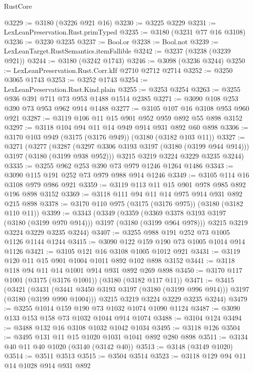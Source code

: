 \begin{lexlean}{RustCore}
\begin{coremodule}
@3229 := @3180 (@3226 @921 @16)
@3230 := @3225 @3229
@3231 := LexLeanPreservation.Rust.primTyped
@3235 := @3180 (@3231 @77 @16 @3108)
@3236 := @3230 @3235
@3237 := Bool.or
@3238 := Bool.not
@3239 := LexLeanTarget.RustSemantics.itemFallible
@3242 := @3237 (@3238 (@3239 @921))
@3244 := @3180 (@3242 @1743)
@3246 := @3098 (@3236 @3244)
@3250 := LexLeanPreservation.Rust.Corr.kIf @2710 @2712 @2714
@3252 := @3250 @3065 @1743
@3253 := @3252 @1743
@3254 := LexLeanPreservation.Rust.Kind.plain
@3255 := @3253 @3254
@3263 := @3255 @936 @391 @711 @73 @953 @1488 @1514 @2385
@3271 := @3090 @108 @253 @390 @73 @953 @962 @914 @1488
@3277 := @3105 @107 @16 @3108 @953 @960 @921
@3287 := @3119 @106 @11 @15 @901 @952 @959 @892 @55 @898 @3152
@3297 := @3118 @104 @94 @11 @14 @949 @914 @931 @892 @60 @898
@3306 := @3170 @103 @949 (@3175 (@3176 @949)) (@3180 (@3182 @103 @11))
@3327 := @3271
    (@3277
      (@3287 (@3297 @3306 @3193 @3197 (@3180 (@3199 @944 @914))) @3197 (@3180 (@3199 @938 @952)))
      @3215
      @3219
      @3224
      @3229
      @3235
      @3244)
@3335 := @3255 @962 @253 @390 @73 @979 @1246 @1264 @1486
@3343 := @3090 @115 @191 @252 @73 @979 @988 @914 @1246
@3349 := @3105 @114 @16 @3108 @979 @986 @921
@3359 := @3119 @113 @11 @15 @901 @978 @985 @892 @196 @898 @3152
@3369 := @3118 @111 @94 @11 @14 @975 @914 @931 @892 @215 @898
@3378 := @3170 @110 @975 (@3175 (@3176 @975)) (@3180 (@3182 @110 @11))
@3399 := @3343
    (@3349
      (@3359 (@3369 @3378 @3193 @3197 (@3180 (@3199 @970 @914))) @3197 (@3180 (@3199 @964 @978)))
      @3215
      @3219
      @3224
      @3229
      @3235
      @3244)
@3407 := @3255 @988 @191 @252 @73 @1005 @1126 @1144 @1244
@3415 := @3090 @122 @159 @190 @73 @1005 @1014 @914 @1126
@3421 := @3105 @121 @16 @3108 @1005 @1012 @921
@3431 := @3119 @120 @11 @15 @901 @1004 @1011 @892 @102 @898 @3152
@3441 := @3118 @118 @94 @11 @14 @1001 @914 @931 @892 @269 @898
@3450 := @3170 @117 @1001 (@3175 (@3176 @1001)) (@3180 (@3182 @117 @11))
@3471 := @3415
    (@3421
      (@3431 (@3441 @3450 @3193 @3197 (@3180 (@3199 @996 @914))) @3197 (@3180 (@3199 @990 @1004)))
      @3215
      @3219
      @3224
      @3229
      @3235
      @3244)
@3479 := @3255 @1014 @159 @190 @73 @1032 @1074 @1090 @1124
@3487 := @3090 @133 @153 @158 @73 @1032 @1044 @914 @1074
@3488 := @3104 @124
@3494 := @3488 @132 @16 @3108 @1032 @1042 @1034
@3495 := @3118 @126
@3504 := @3495 @131 @11 @15 @1020 @1031 @1041 @892 @280 @898
@3511 := @3134 @40 @11 @40 @1020 (@3140 (@3142 @40))
@3513 := @3148 (@3149 @1020)
@3514 := @3511 @3513
@3515 := @3504 @3514
@3523 := @3118 @129 @94 @11 @14 @1028 @914 @931 @892

\end{coremodule}
\end{lexlean}

